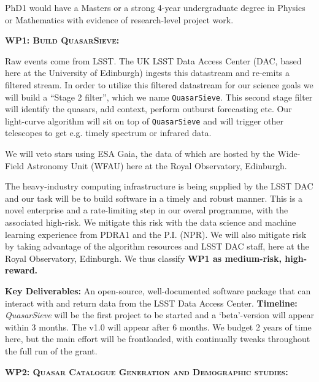 \smallskip
\smallskip
\noindent
PhD1 would have a Masters or a strong 4-year undergraduate degree in
Physics or Mathematics with evidence of research-level project work.



\medskip \medskip
\smallskip
\smallskip
\noindent
\textbf{\textsc{WP1: Build QuasarSieve:}} 

\smallskip
\smallskip
\noindent
Raw events come from LSST. The UK LSST Data Access Center (DAC, based
here at the University of Edinburgh) ingests this datastream and
re-emits a filtered stream. In order to utilize this filtered
datastream for our science goals we will build a ``Stage 2 filter'',
which we name {\tt QuasarSieve}.  This second stage filter will
identify the quasars, add context, perform outburst forecasting etc.
Our light-curve algorithm will sit on top of {\tt QuasarSieve} and
will trigger other telescopes to get e.g. timely spectrum or infrared
data.

\smallskip
\smallskip
\noindent
We will veto stars using ESA Gaia, the data of which are hosted by the
Wide-Field Astronomy Unit (WFAU) here at the Royal Observatory,
Edinburgh.

\smallskip
\smallskip
\noindent
The heavy-industry computing infrastructure is being supplied by the
LSST DAC and our task will be to build software in a timely and robust
manner.  This is a novel enterprise and a rate-limiting step in our
overal programme, with the associated high-risk.  We mitigate this
risk with the data science and machine learning experience from PDRA1
and the P.I. (NPR).  We will also mitigate risk by taking advantage of
the algorithm resources and LSST DAC staff, here at the Royal
Observatory, Edinburgh.  We thus classify {\bf WP1 as medium-risk,
high-reward.}  

\smallskip
\smallskip
\noindent
{\bf Key Deliverables:} An open-source, well-documented
software package that can interact with and return data from the LSST
Data Access Center. {\bf Timeline:} {\it QuasarSieve} will be the first 
project to be started and a `beta'-version will appear within 3 months. 
The v1.0 will appear after 6 months. We budget 2 years of time here, 
but the main effort will be frontloaded, with continually tweaks throughout
the full run of the grant. 


\medskip 
\medskip
\smallskip
\smallskip
\noindent
\textbf{\textsc{WP2: Quasar Catalogue Generation and Demographic studies:}}  

